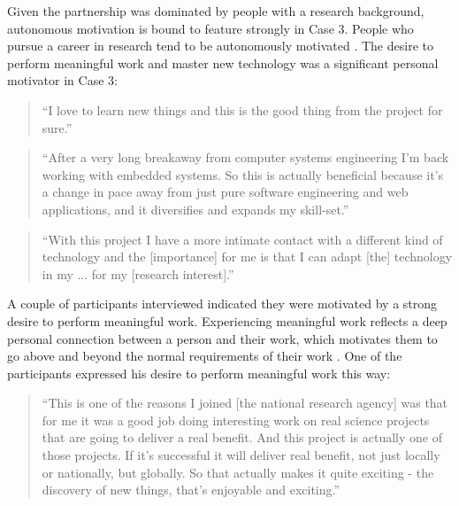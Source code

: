 Given the partnership was dominated by people with a research background, autonomous motivation is bound to feature strongly in Case 3. People who pursue a career in research tend to be autonomously motivated \citep{ryan2014work,suominen2021gold}. The desire to perform meaningful work and master new technology was a significant personal motivator in Case 3:

\begin{quote}
\small
\enquote{I love to learn new things and this is the good thing from the project for sure.} \\
\end{quote}

\begin{quote}
\small
\enquote{After a very long breakaway from computer systems engineering I'm back working with embedded systems. So this is actually beneficial because it's a change in pace away from just pure software engineering and web applications, and it diversifies and expands my skill-set.} \\
\end{quote}

\begin{quote}
\small
\enquote{With this project I have a more intimate contact with a different kind of technology and the [importance] for me is that I can adapt [the] technology in my ... for my [research interest].} \\
\end{quote}

A couple of participants interviewed indicated they were motivated by a strong desire to perform meaningful work. Experiencing meaningful work reflects a deep personal connection between a person and their work, which motivates them to go above and beyond the normal requirements of their work \citep{van2018motivational}. One of the participants expressed his desire to perform meaningful work this way:

\begin{quote}
\small
\enquote{This is one of the reasons I joined [the national research agency] was that for me it was a good job doing interesting work on real science projects that are going to deliver a real benefit. And this project is actually one of those projects. If it's successful it will deliver real benefit, not just locally or nationally, but globally. So that actually makes it quite exciting - the discovery of new things, that's enjoyable and exciting.} \\
\end{quote}
 
